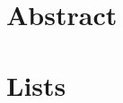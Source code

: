 \newcommand{\introduce}[1]{\emph{#1}\index{#1}} %
\newcommand{\reuse}[1]{\emph{#1}\index{#1}} %

\newcommand{\lastAccessed}{(last accessed: Mar.\ 3rd, 2012)} %

\newcommand{\lO}{\mathcal{O}} %

\newcommand{\curie}[1]{\url{#1}} 
\newcommand{\iri}[1]{<\url{#1}>}
\newcommand{\iripart}[1]{\url{#1}}



\frontmatter %



\begingroup
	\chapter{Abstract}
	
\endgroup

\setcounter{tocdepth}{1} %
\tableofcontents

\chapter{Lists}
\begingroup
	\renewcommand*{\chapter}{\section}
	\renewcommand*{\addchap}{\addsec}
	\renewcommand*{\listfigurename}{Figures}
	\listoffigures
	\renewcommand*{\listtablename}{Tables}
	\listoftables
	\renewcommand{\lstlistlistingname}{Listings}
	\lstlistoflistings
\endgroup

